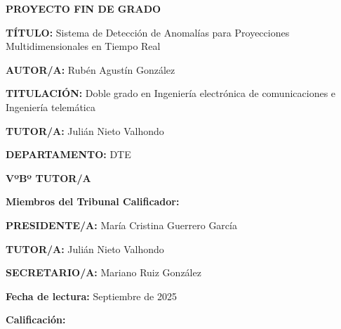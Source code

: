 \vspace{7cm}
\begin{center}
	{\fontsize{20}{24} \textbf{PROYECTO FIN DE GRADO} } \\
	
\end{center}
\vspace{1,3cm}
\begin{adjustwidth}{4cm}{3cm}
	{\setlength{\parskip}{0pt} \setlength{\parindent}{0pt}

{\fontsize{11}{13,2}
	{\textbf{TÍTULO:} Sistema de Detección de Anomalías para Proyecciones Multidimensionales en Tiempo Real}\vspace{19pt}
	
	{\textbf{AUTOR/A:} Rubén Agustín González }\vspace{19pt}
	
	{\textbf{TITULACIÓN:} Doble grado en Ingeniería electrónica de comunicaciones e Ingeniería telemática }\vspace{19pt}
	
	{\textbf{TUTOR/A:} Julián Nieto Valhondo} \vspace{19pt}
	
	{\textbf{DEPARTAMENTO:} DTE}\vspace{19pt}
	
	\hspace*{\fill}	{\textbf{VºBº TUTOR/A}  }\vspace{17pt}
	
	{\textbf{Miembros del Tribunal Calificador:}}\vspace{19pt}
	
	{\textbf{PRESIDENTE/A:} María Cristina Guerrero García}\vspace{19pt}
	
	{\textbf{TUTOR/A:} Julián Nieto Valhondo}\vspace{19pt}
	
	{\textbf{SECRETARIO/A:} Mariano Ruiz González}\vspace{19pt}
	
	{\textbf{Fecha de lectura:} Septiembre de 2025}\vspace{19pt}
	
	{\textbf{Calificación:} }\vspace{19pt}
	
	\vspace{19pt}
}
}
\end{adjustwidth}

\restoregeometry